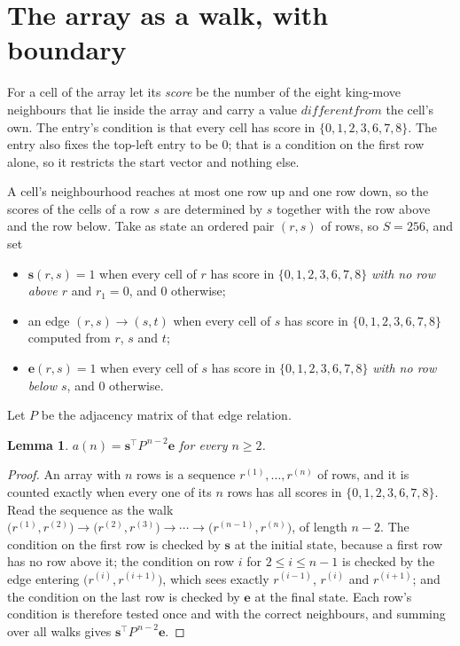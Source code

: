 \documentclass[11pt,a4paper]{article}
\theoremstyle{plain}
\newtheorem{lemma}[theorem]{Lemma}
\theoremstyle{definition}
\begin{document}
\section{The array as a walk, with boundary}

For a cell of the array let its \emph{score} be the number of the eight king-move neighbours that lie inside
the array and carry a value $different from$ the cell's own. The entry's condition is that every cell
has score in $\{0,1,2,3,6,7,8\}$. The entry also fixes the top-left entry to be $0$; that is a condition on the first row alone, so it restricts the start vector and nothing else.

A cell's neighbourhood reaches at most one row up and one row down, so the scores of the
cells of a row $s$ are determined by $s$ together with the row above and the row below.
Take as state an ordered pair $(r,s)$ of rows, so $S=256$, and set
\begin{itemize}
\item $\mathbf{s}(r,s)=1$ when every cell of $r$ has score in $\{0,1,2,3,6,7,8\}$ \emph{with no row
above $r$} and $r_1=0$, and $0$ otherwise;
\item an edge $(r,s)\to(s,t)$ when every cell of $s$ has score in $\{0,1,2,3,6,7,8\}$ computed from
$r$, $s$ and $t$;
\item $\mathbf{e}(r,s)=1$ when every cell of $s$ has score in $\{0,1,2,3,6,7,8\}$ \emph{with no row
below $s$}, and $0$ otherwise.
\end{itemize}
Let $P$ be the adjacency matrix of that edge relation.

\begin{lemma}\label{lem:walk}
$a(n)=\mathbf{s}^{\!\top}P^{\,n-2}\mathbf{e}$ for every $n\ge2$.
\end{lemma}

\begin{proof}
An array with $n$ rows is a sequence $r^{(1)},\dots,r^{(n)}$ of rows, and it is counted
exactly when every one of its $n$ rows has all scores in $\{0,1,2,3,6,7,8\}$. Read the sequence as the
walk $\bigl(r^{(1)},r^{(2)}\bigr)\to\bigl(r^{(2)},r^{(3)}\bigr)\to\cdots\to
\bigl(r^{(n-1)},r^{(n)}\bigr)$, of length $n-2$. The condition on the first row is
checked by $\mathbf{s}$ at the initial state, because a first row has no row above it; the
condition on row $i$ for $2\le i\le n-1$ is checked by the edge entering
$\bigl(r^{(i)},r^{(i+1)}\bigr)$, which sees exactly $r^{(i-1)}$, $r^{(i)}$ and
$r^{(i+1)}$; and the condition on the last row is checked by $\mathbf{e}$ at the final
state. Each row's condition is therefore tested once and with the correct neighbours, and
summing over all walks gives $\mathbf{s}^{\!\top}P^{\,n-2}\mathbf{e}$.
\end{proof}
\end{document}
